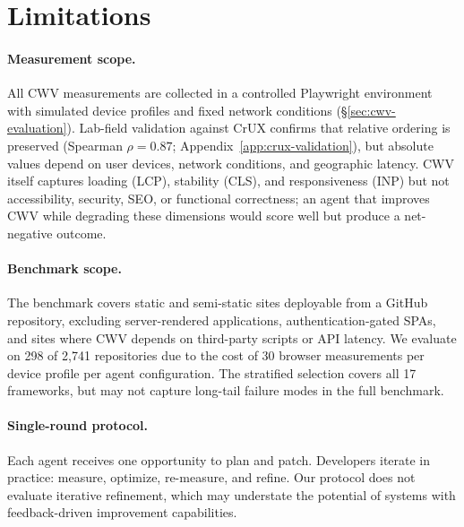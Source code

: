 \section{Limitations}

\paragraph{Measurement scope.}
All CWV measurements are collected in a controlled Playwright environment with simulated device profiles and fixed network conditions (\S\ref{sec:cwv-evaluation}). Lab-field validation against CrUX confirms that relative ordering is preserved (Spearman $\rho = 0.87$; Appendix~\ref{app:crux-validation}), but absolute values depend on user devices, network conditions, and geographic latency. CWV itself captures loading (LCP), stability (CLS), and responsiveness (INP) but not accessibility, security, SEO, or functional correctness; an agent that improves CWV while degrading these dimensions would score well but produce a net-negative outcome.

\paragraph{Benchmark scope.}
The benchmark covers static and semi-static sites deployable from a GitHub repository, excluding server-rendered applications, authentication-gated SPAs, and sites where CWV depends on third-party scripts or API latency. We evaluate on 298 of 2{,}741 repositories due to the cost of 30 browser measurements per device profile per agent configuration. The stratified selection covers all 17 frameworks, but may not capture long-tail failure modes in the full benchmark.

\paragraph{Single-round protocol.}
Each agent receives one opportunity to plan and patch. Developers iterate in practice: measure, optimize, re-measure, and refine. Our protocol does not evaluate iterative refinement, which may understate the potential of systems with feedback-driven improvement capabilities.
